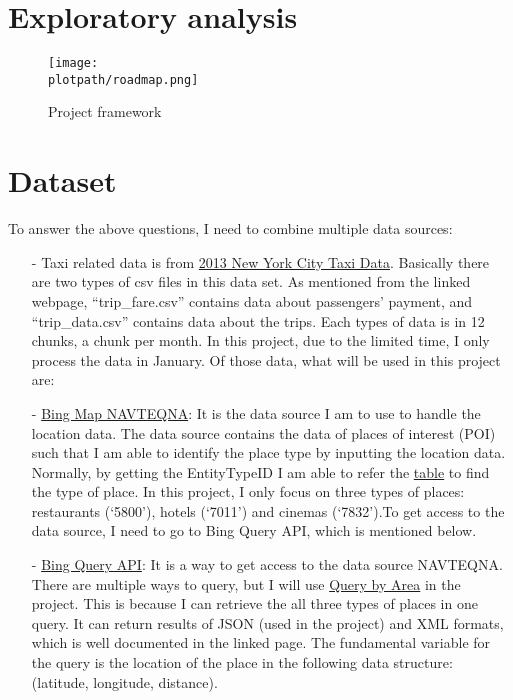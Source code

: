 \documentclass[a4paper]{article}
\begin{document}
\section{Exploratory analysis}
\begin{figure}[H]
\begin{center}
\texttt{[image: \\plotpath/roadmap.png]}
\end{center}
\label{}
\caption{Project framework}
\end{figure}

\section{Dataset}
To answer the above questions, I need to combine multiple data sources:
\begin{itemize}
\item[-] Taxi related data is from \href{http://publish.illinois.edu/dbwork/open-data/}{2013 New York City Taxi Data}. Basically there are two types of csv files in this data set. As mentioned from the linked webpage, ``trip\_fare.csv'' contains data about passengers' payment, and ``trip\_data.csv'' contains data about the trips. Each types of data is in 12 chunks, a chunk per month. In this project, due to the limited time, I only process the data in January. Of those data, what will be used in this project are:
\item[-] \href{https://msdn.microsoft.com/en-us/library/hh478192.aspx}{Bing Map NAVTEQNA}: It is the data source I am to use to handle the location data. The data source contains the data of places of interest (POI) such that I am able to identify the place type by inputting the location data. Normally, by getting the EntityTypeID I am able to refer the \href{https://msdn.microsoft.com/en-us/library/hh478191.aspx}{table} to find the type of place. In this project, I only focus on three types of places: restaurants (`5800'), hotels (`7011') and cinemas (`7832').To get access to the data source, I need to go to Bing Query API, which is mentioned below.
\item[-] \href{https://msdn.microsoft.com/en-us/library/gg585126.aspx}{Bing Query API}: It is a way to get access to the data source NAVTEQNA. There are multiple ways to query, but I will use \href{https://msdn.microsoft.com/en-us/library/gg585133.aspx}{Query by Area} in the project. This is because I can retrieve the all three types of places in one query. It can return results of JSON (used in the project) and XML formats, which is well documented in the linked page. The fundamental variable for the query is the location of the place in the following data structure: (latitude, longitude, distance).

\end{itemize}
\end{document}
